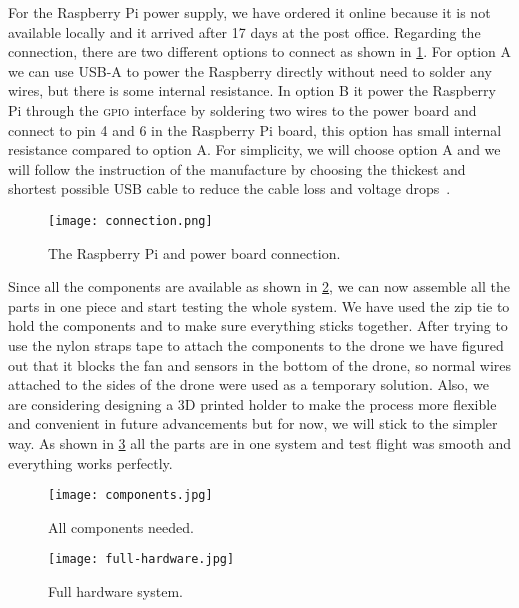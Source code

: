\documentclass[../main.tex]{subfiles}
\begin{document}
For the Raspberry Pi power supply, we have ordered it 
online because it is not available locally and 
it arrived after 17 days at the post office.
Regarding the connection, there are 
two different options to connect as shown in \cref{fig:connection}.
For option A we can use USB-A to power the Raspberry directly without
need to solder any wires,
but there is some internal resistance.
In option B it power the Raspberry Pi through the \textsc{gpio} 
interface by soldering two wires to the power board and 
connect to pin 4 and 6 in the Raspberry Pi board,
this option has small internal resistance compared to option A.
For simplicity, we will choose option A and we will 
follow the instruction of the manufacture by choosing 
the thickest and shortest possible USB cable to reduce 
the cable loss and voltage drops~\cite{makerfocus}.

 \begin{figure}[p]
 	\centering
 	\texttt{[image: connection.png]}
 	\caption{The Raspberry Pi and power board connection.}
 	\label{fig:connection}
 \end{figure}   

Since all the components are available as shown 
in \cref{fig:components}, we can now assemble 
all the parts in one piece and start testing the whole system.
We have used the zip tie to hold the components and to
make sure everything sticks together. After trying to use the 
nylon straps tape to attach the components to the drone 
we have figured out that it blocks the fan 
and sensors in the bottom of the drone, 
so normal wires attached to the sides of the drone were 
used as a temporary solution. Also, we are considering 
designing a 3D printed holder to make the process more 
flexible and convenient in future advancements but for now,
we will stick to the simpler way. As shown in 
\cref{fig:full-hardware} all the parts are in one system 
and test flight was smooth and everything works perfectly. 

 \begin{figure}[p]
	\centering
	\texttt{[image: components.jpg]}
	\caption{All components needed.}
	\label{fig:components}
\end{figure}

  \begin{figure}[p]
 	\centering
 	\texttt{[image: full-hardware.jpg]}
 	\caption{Full hardware system.}
 	\label{fig:full-hardware}
 \end{figure}  
\end{document}
